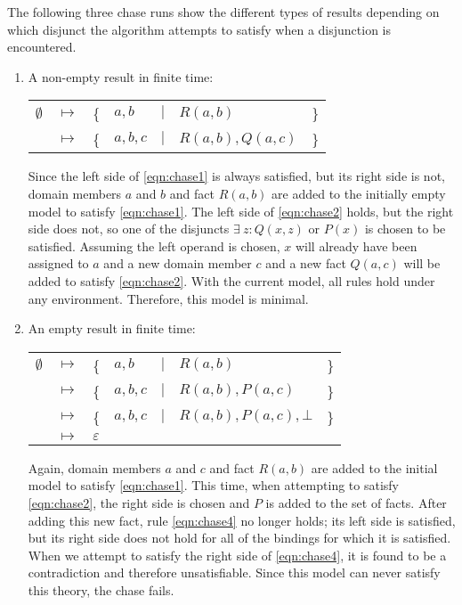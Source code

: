 		The following three chase runs show the different types of results
		depending on which disjunct the algorithm attempts to satisfy when a
		disjunction is encountered.

		\begin{enumerate}
		\item A non-empty result in finite time:

			\begin{tabular}{lllllll}
				$\emptyset$ & $\mapsto$ & \{ & $a,b$   & $|$ & $R(a,b)$         & \} \\
				{}          & $\mapsto$ & \{ & $a,b,c$ & $|$ & $R(a,b), Q(a,c)$ & \}
			\end{tabular}

			Since the left side of \eqref{eqn:chase1} is always satisfied, but
			its right side is not, domain members $a$ and $b$ and fact $R(a,b)$
			are added to the initially empty model to satisfy \eqref{eqn:chase1}.
			The left side of \eqref{eqn:chase2} holds, but the right side does
			not, so one of the disjuncts $\exists\ z : Q(x,z)$ or $P(x)$ is
			chosen to be satisfied. Assuming the left operand is chosen, $x$
			will already have been assigned to $a$ and a new domain member $c$
			and a new fact $Q(a,c)$ will be added to satisfy \eqref{eqn:chase2}.
			With the current model, all rules hold under any environment.
			Therefore, this model is minimal.

		\item An empty result in finite time:

			\begin{tabular}{lllllll}
				$\emptyset$ & $\mapsto$ & \{ & $a,b$   & $|$ & $R(a,b)$               & \} \\
				{}          & $\mapsto$ & \{ & $a,b,c$ & $|$ & $R(a,b), P(a,c)$       & \} \\
				{}          & $\mapsto$ & \{ & $a,b,c$ & $|$ & $R(a,b), P(a,c), \bot$ & \} \\
				{}          & $\mapsto$ & \multicolumn{5}{l}{ $\varepsilon$ }
			\end{tabular}

			Again, domain members $a$ and $c$ and fact $R(a,b)$ are added to
			the initial model to satisfy \eqref{eqn:chase1}. This time, when
			attempting to satisfy \eqref{eqn:chase2}, the right side is chosen
			and $P$ is added to the set of facts. After adding this new fact,
			rule \eqref{eqn:chase4} no longer holds; its left side is
			satisfied, but its right side does not hold for all of the bindings
			for which it is satisfied. When we attempt to satisfy the right
			side of \eqref{eqn:chase4}, it is found to be a contradiction and
			therefore unsatisfiable. Since this model can never satisfy this
			theory, the chase fails.


\end{enumerate}
